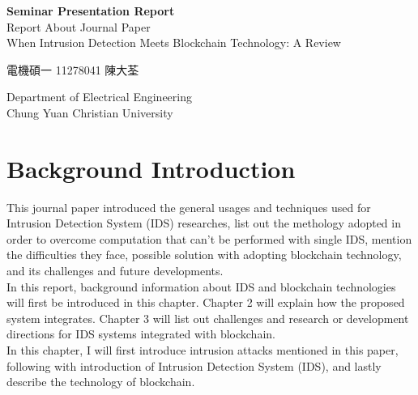 \documentclass[12pt]{report}
\begin{document}
\begin{titlepage}
    \begin{center}
        \vspace*{2cm}
        \Large
        \textbf{Seminar Presentation Report} \\
        \vspace{1.5cm}
        Report About Journal Paper \cite{8274922} \\
		When Intrusion Detection Meets Blockchain Technology: A Review
        \vspace{1.5cm}
		\begin{CJK*}{UTF8}{bsmi}
        電機碩一 11278041 陳大荃
		\end{CJK*}
        \vfill
        Department of Electrical Engineering\\
        \vspace{0.2cm}
        Chung Yuan Christian University\\
        \vspace{0.2cm}
		\date{\today}
        \normalsize
    \end{center}
\end{titlepage}
\tableofcontents
\listoffigures

\chapter{Background Introduction}


This journal paper introduced the general usages and techniques used for Intrusion Detection System (IDS) researches, list out the methology adopted in order to overcome computation that can't be performed with single IDS, mention the difficulties they face, possible solution with adopting blockchain technology, and its challenges and future developments. \\

In this report, background information about IDS and blockchain technologies will first be introduced in this chapter. Chapter 2 will explain how the proposed system integrates. Chapter 3 will list out challenges and research or development directions for IDS systems integrated with blockchain. \\

In this chapter, I will first introduce intrusion attacks mentioned in this paper, following with introduction of Intrusion Detection System (IDS), and lastly describe the technology of blockchain. 
\end{document}
